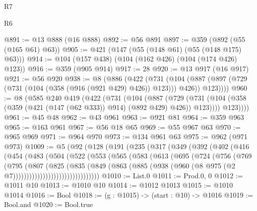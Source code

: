 \begin{lexlean}{R7}
\begin{lexlean}{R6}
\begin{coremodule}
{{{{{{{{{{{{{{{{{{{{@891 := @13 @888 (@16 @888)
@892 := @56 @891
@897 := @359 (@892 (@55 (@165 @61) @63))
@905 := @421 (@147 (@55 (@148 @61) (@55 (@148 @175) @63)))
@914 := @104 (@157 @438) (@104 (@162 @426) (@104 (@174 @426) @123))
@916 := @359 (@905 @914)
@917 := 28
@920 := @13 @917 (@16 @917)
@921 := @56 @920
@938 := @8
    (@886
      (@422
        (@731
          (@104 (@887 (@897 (@729 (@731 (@104 (@358 (@916 (@921 @429) @426)) @123))) @426)) @123))))
@960 := @8
    (@585
      @240
      @419
      (@422
        (@731
          (@104
            (@887
              (@729
                (@731 (@104 (@358 (@359 (@421 (@147 (@62 @333)) @914) (@892 @429) @426)) @123))))
            @123))))
@961 := @45 @48
@962 := @43 @961
@963 := @921 @81
@964 := @359 @963
@965 := @163 @961
@967 := @56 @18 @65
@969 := @55 @967 @63
@970 := @965 @969
@971 := @964 @970
@973 := @134 @961 @63
@975 := @962 (@971 @973)
@1009 := @5
    (@92
      (@128
        (@191
          (@235
            (@317
              (@349
                (@392
                  (@402
                    (@416
                      (@454
                        (@483
                          (@504
                            (@522
                              (@553
                                (@565
                                  (@583
                                    (@613
                                      (@695
                                        (@724
                                          (@756
                                            (@769
                                              (@795
                                                (@807
                                                  (@825
                                                    (@835
                                                      (@849
                                                        (@863
                                                          (@885
                                                            (@938
                                                              (@960
                                                                (@8
                                                                  @975
                                                                  (@2
                                                                    @7))))))))))))))))))))))))))))))))
@1010 := List.{0}
@1011 := Prod.{0, 0}
@1012 := @1011 @10
@1013 := @1010 @10
@1014 := @1012 @1013
@1015 := @1010 @1014
@1016 := Bool
@1018 := (g : @1015) -> (start : @10) -> @1016
@1019 := Bool.and
@1020 := Bool.true
}}}}}}}}}}}}}}}}}}}}
\end{coremodule}
\end{lexlean}
\end{lexlean}
